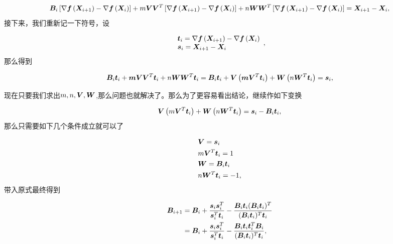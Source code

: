 \documentclass[12pt,oneside,a4paper]{article}
\begin{document}
\begin{equation*}
\bfB_{i}\left[\nabla \bff\left(\bfX_{i+1}\right)-\nabla \bff\left(\bfX_{i}\right)\right]+
m \bfV \bfV^{T}\left[\nabla \bff\left(\bfX_{i+1}\right)-\nabla \bff\left(\bfX_{i}\right)\right]+
n \bfW \bfW^{T}\left[\nabla \bff\left(\bfX_{i+1}\right)-\nabla \bff\left(\bfX_{i}\right)\right]=\bfX_{i+1}-\bfX_{i},
\end{equation*}
接下来，我们重新记一下符号，设

\begin{equation*}
\begin{array}{l}
\bft_{i}=\nabla \bff\left(\bfX_{i+1}\right)-\nabla \bff\left(\bfX_{i}\right) \\
\bfs_{i}=\bfX_{i+1}-\bfX_{i}
\end{array},
\end{equation*}
那么得到

\begin{equation*}
\bfB_{i} \bft_{i}+\bfm \bfV \bfV^{T} \bft_{i}+n \bfW \bfW^{T} \bft_{i}=
\bfB_{i} \bft_{i}+\bfV\left(\bfm \bfV^{T} \bft_{i}\right)+\bfW\left(n \bfW^{T} \bft_{i}\right)=\bfs_{i},
\end{equation*}

现在只要我们求出$m,n,\bfV,\bfW$,那么问题也就解决了。那么为了更容易看出结论，继续作如下变换

\begin{equation*}
\bfV\left(m \bfV^{T} \bft_{i}\right)+\bfW\left(n \bfW^{T} \bft_{i}\right)=\bfs_{i}-\bfB_{i} \bft_{i},
\end{equation*}
那么只需要如下几个条件成立就可以了

\begin{align*}
&\bfV=\bfs_{i}\\
&m \bfV^{T} \bft_{i}=1\\
&\bfW =\bfB_i \bft_i\\
&n \bfW^{T} \bft_{i}=-1,
\end{align*}
带入原式最终得到

\begin{align*}
\bfB_{i+1} &= \bfB_i+\frac{\bfs_i \bfs_{i}^{T}}{\bfs_i^{T} \bft_i}-
\frac{\bfB_i \bft_i(\bfB_i \bft_i)^T}{(\bfB_i \bft_i)^T \bft_i} \\
&=\bfB_i+\frac{\bfs_i \bfs_{i}^{T}}{\bfs_i^{T} \bft_i}-
\frac{\bfB_i \bft_i \bft_i^T \bfB_i}{(\bfB_i \bft_i)^T \bft_i},
\end{align*}
\end{document}
